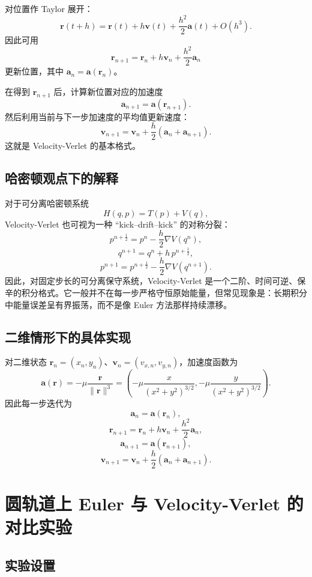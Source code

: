 对位置作 Taylor 展开：
\[
\bm r(t+h)=\bm r(t)+h\bm v(t)+\frac{h^2}{2}\bm a(t)+O(h^3).
\]
因此可用
\begin{equation}\label{eq:vv-r}
\bm r_{n+1}=\bm r_n+h\bm v_n+\frac{h^2}{2}\bm a_n
\end{equation}
更新位置，其中 \(\bm a_n=\bm a(\bm r_n)\)。

在得到 \(\bm r_{n+1}\) 后，计算新位置对应的加速度
\[
\bm a_{n+1}=\bm a(\bm r_{n+1}).
\]
然后利用当前与下一步加速度的平均值更新速度：
\begin{equation}\label{eq:vv-v}
\bm v_{n+1}=\bm v_n+\frac{h}{2}(\bm a_n+\bm a_{n+1}).
\end{equation}
这就是 Velocity-Verlet 的基本格式。

\subsection{哈密顿观点下的解释}

对于可分离哈密顿系统
\[
H(q,p)=T(p)+V(q),
\]
Velocity-Verlet 也可视为一种 ``kick--drift--kick'' 的对称分裂：
\[
p^{n+\frac12}=p^n-\frac{h}{2}\nabla V(q^n),
\]
\[
q^{n+1}=q^n+h\,p^{n+\frac12},
\]
\[
p^{n+1}=p^{n+\frac12}-\frac{h}{2}\nabla V(q^{n+1}).
\]
因此，对固定步长的可分离保守系统，Velocity-Verlet 是一个二阶、时间可逆、保辛的积分格式。它一般并不在每一步严格守恒原始能量，但常见现象是：长期积分中能量误差呈有界振荡，而不是像 Euler 方法那样持续漂移。

\subsection{二维情形下的具体实现}

对二维状态 \(\bm r_n=(x_n,y_n)\)、\(\bm v_n=(v_{x,n},v_{y,n})\)，加速度函数为
\[
\bm a(\bm r)=
-\mu \frac{\bm r}{\|\bm r\|^3}
=
\left(
-\mu \frac{x}{(x^2+y^2)^{3/2}},
-\mu \frac{y}{(x^2+y^2)^{3/2}}
\right).
\]
因此每一步迭代为
\[
\bm a_n=\bm a(\bm r_n),
\]
\[
\bm r_{n+1}=\bm r_n+h\bm v_n+\frac{h^2}{2}\bm a_n,
\]
\[
\bm a_{n+1}=\bm a(\bm r_{n+1}),
\]
\[
\bm v_{n+1}=\bm v_n+\frac{h}{2}(\bm a_n+\bm a_{n+1}).
\]

\section{圆轨道上 Euler 与 Velocity-Verlet 的对比实验}

\subsection{实验设置}

